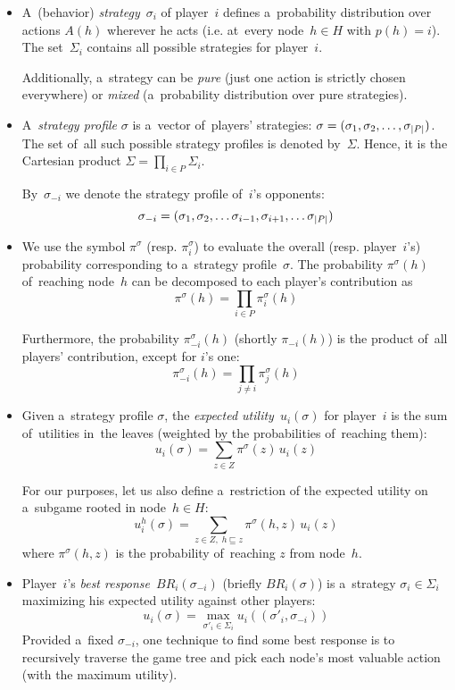 \begin{itemize}
  \item A~(behavior) \emph{strategy}~$\sigma_i$ of player~$i$ defines a~probability distribution over actions $A(h)$ wherever he acts (i.e. at~every node~$h \in H$ with $p(h) = i$).
    The set~$\Sigma_i$ contains all possible strategies for player~$i$.

  Additionally, a~strategy can be \emph{pure} (just one action is strictly chosen everywhere) or \emph{mixed} (a~probability distribution over pure strategies).

  \item A~\emph{strategy profile} $\sigma$ is a~vector of~players' strategies:
    $\sigma = (\sigma_1, \sigma_2, \ldots, \sigma_ {\left|{P}\right|})$.
    The set of~all such possible strategy profiles is denoted by~$\Sigma$.
    Hence, it is the Cartesian product $\Sigma = \prod_{i \in P} \Sigma_i$.

    By~$\sigma_{-i}$ we denote the strategy profile of~$i$'s opponents:
    \[ \sigma_{-i} = (\sigma_1, \sigma_2, \ldots \sigma_{i-1}, \sigma_{i+1}, \ldots \sigma_ {\left|{P}\right|}) \]

  \item We use the symbol $\pi^\sigma$ (resp. $\pi_i^\sigma$) to evaluate the overall (resp. player~$i$'s) probability corresponding to a~strategy profile~$\sigma$.
    The probability $\pi^\sigma(h)$ of~reaching node~$h$ can be decomposed to each player's contribution as
    \[ \pi ^\sigma(h) = \prod _{i \in P} \pi _i ^\sigma (h) \]

    Furthermore, the probability $\pi _{-i} ^\sigma (h)$ (shortly $\pi _{-i} (h)$) is the product of~all players' contribution, except for $i$'s one:
    \[ \pi _{-i} ^\sigma(h) = \prod _{j \ne i} \pi _j ^\sigma (h) \]
    
  \item Given a~strategy profile $\sigma$, the \emph{expected utility}~$u_i (\sigma)$ for player~$i$
    is the sum of~utilities in~the leaves (weighted by the probabilities of~reaching them):
    \[ u_i (\sigma) = \sum _{z \in Z} \pi^\sigma\!(z) \,u_i(z)\]

    For our purposes, let us also define a~restriction of the expected utility on a~subgame rooted in node~$h\in H$:
    \[ u_i^h(\sigma) = \sum _{z \in Z,\; h \sqsubseteq z} \pi^\sigma\!(h,z) \,u_i(z) \]
    where $\pi^\sigma(h,z)$ is the probability of~reaching $z$ from node~$h$.

  \item Player~$i$'s \emph{best response}~$BR _i (\sigma _{-i})$ (briefly $BR _i (\sigma)$) is a~strategy $\sigma _i \in \Sigma _i$ maximizing his expected utility against other players:
    \[ u_i (\sigma) = \max _{\sigma'_i \in \Sigma_i} u_i ((\sigma'_i, \sigma_{-i})) \]
    Provided a~fixed $\sigma_{-i}$, one technique to find some best response is to recursively traverse the game tree and pick each node's most valuable action (with the maximum utility).
\end{itemize}
